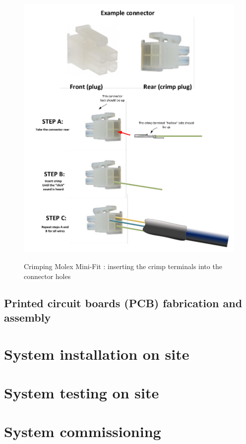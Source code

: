 \begin{figure}
  \centering
  \includegraphics[angle=90,width=1\columnwidth]{figs/body03/FIGCRIMP8.pdf}\\
  \caption[Crimping Molex Mini-Fit \textregistered: inserting the crimp terminals into the connector holes]{Crimping Molex Mini-Fit \textregistered: inserting the crimp terminals into the connector holes}
  \label{FIG:CRIMP8}
\end{figure}
\subsection{Printed circuit boards (PCB) fabrication and assembly}
\section{System installation on site}
\section{System testing on site}
\section{System commissioning} 